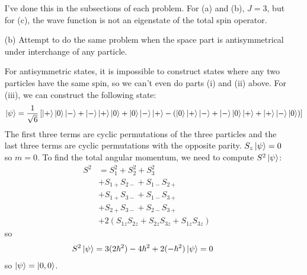 \documentclass[a4paper,twoside]{article}
\begin{document}
\begin{itemize}
\begin{problem}
            I've done this in the subsections of each problem. For (a) and (b), $ J = 3 $, but for (c), the wave function is not an eigenstate of the total spin operator.
        \end{problem}
    \item[(b)] Attempt to do the same problem when the space part is antisymmetrical under interchange of any particle.
        \begin{problem}
            For antisymmetric states, it is impossible to construct states where any two particles have the same spin, so we can't even do parts (i) and (ii) above. For (iii), we can construct the following state:
            \begin{equation}
                \ket{\psi} = \frac{1}{\sqrt{6}} \left[\ket{+}\ket{0}\ket{-} +\ket{-}\ket{+}\ket{0} +\ket{0}\ket{-}\ket{+} - \left(\ket{0}\ket{+}\ket{-} +\ket{-}\ket{0}\ket{+} +\ket{+}\ket{-}\ket{0} \right) \right]
            \end{equation}
            The first three terms are cyclic permutations of the three particles and the last three terms are cyclic permutations with the opposite parity. $ S_z\ket{\psi} = 0 $ so $ m = 0 $. To find the total angular momentum, we need to compute $ S^2\ket{\psi} $:
            \begin{align}
                S^2 &= S_1^2 + S_2^2 + S_3^2 \\
                &+ S_{1+} S_{2-} + S_{1-} S_{2+} \\
                &+ S_{1+} S_{3-} + S_{1-} S_{3+} \\
                &+ S_{2+} S_{3-} + S_{2-} S_{3+} \\
                &+ 2 (S_{1z} S_{2z} + S_{2z} S_{3z} + S_{1z} S_{3z})
            \end{align}
            so
            \begin{align}
                S^2\ket{\psi} &= 3(2 \hbar^2) - 4 \hbar^2 + 2(- \hbar^2 )\ket{\psi} = 0
            \end{align}
            so $\ket{\psi} =\ket{0,0} $.
        \end{problem}
\end{itemize}
\end{document}
